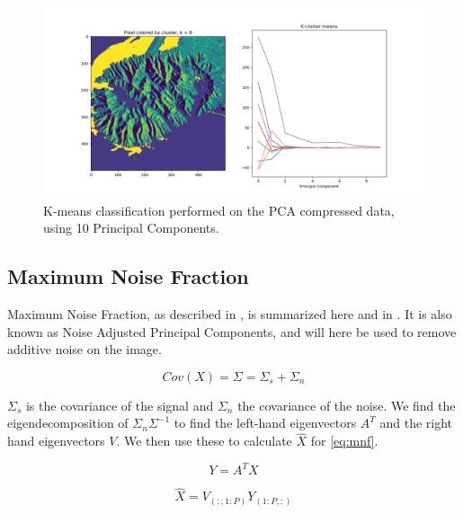 \begin{figure}
    \centering
    \includegraphics[width=\textwidth]{../fig/kmean/PCA_8}
    \caption{K-means classification performed on the PCA compressed data, using 10 Principal Components.}
    \label{fig:pca_kmean}
\end{figure}


\subsection{Maximum Noise Fraction}


Maximum Noise Fraction, as described in \cite{green1988}, is summarized here and in \cite{assignment}. 
It is also known as Noise Adjusted Principal Components, and will here be used to 
remove additive noise on the image. 


\begin{equation}
    Cov(X) = \Sigma = \Sigma_s + \Sigma_n
\end{equation}

$\Sigma_s$ is the covariance of the signal and $\Sigma_n$ the covariance of the noise. 
We find the eigendecomposition of $\Sigma_n \Sigma^{-1}$ to find the left-hand eigenvectors 
$A^T$ and the right hand eigenvectors $V$. We then use these to calculate $\hat{X}$ for \cref{eq:mnf}.

\begin{equation}
    Y = A^T X
\end{equation}

\begin{equation}
    \label{eq:mnf}
    \hat{X} = V_{(:, 1:P)} Y_{(1:P, :)}
\end{equation}

